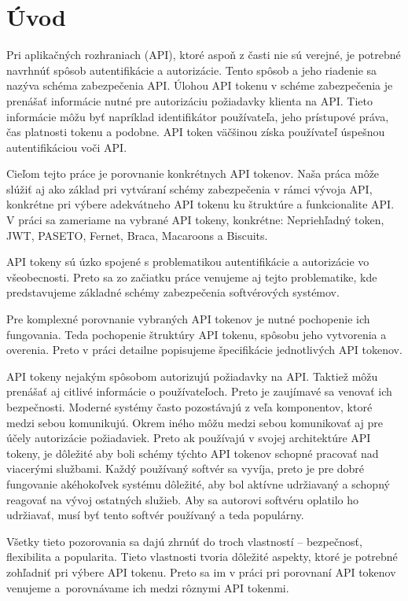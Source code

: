 \chapter*{Úvod} %

Pri aplikačných rozhraniach (API), ktoré aspoň z časti nie sú verejné, je potrebné navrhnúť spôsob autentifikácie a autorizácie. Tento spôsob a jeho riadenie sa nazýva schéma zabezpečenia API. Úlohou API tokenu v schéme zabezpečenia je prenášať informácie nutné pre autorizáciu požiadavky klienta na API. Tieto informácie môžu byť napríklad identifikátor používateľa, jeho prístupové práva, čas platnosti tokenu a podobne. API token väčšinou získa používateľ úspešnou autentifikáciou voči API.

Cieľom tejto práce je porovnanie konkrétnych API tokenov. Naša práca môže slúžiť aj ako základ pri vytváraní schémy zabezpečenia v rámci vývoja API, konkrétne pri výbere adekvátneho API tokenu ku štruktúre a funkcionalite API. V práci sa zameriame na vybrané API tokeny, konkrétne: Nepriehľadný token, JWT, PASETO, Fernet, Braca, Macaroons a Biscuits.

API tokeny sú úzko spojené s problematikou autentifikácie a autorizácie vo všeobecnosti. Preto sa zo začiatku práce venujeme aj tejto problematike, kde predstavujeme základné schémy zabezpečenia softvérových systémov.

Pre komplexné porovnanie vybraných API tokenov je nutné pochopenie ich fungovania. Teda pochopenie štruktúry API tokenu, spôsobu jeho vytvorenia a overenia. Preto v práci detailne popisujeme špecifikácie jednotlivých API tokenov.

API tokeny nejakým spôsobom autorizujú požiadavky na API. Taktiež môžu prenášať aj citlivé informácie o používateľoch. Preto je zaujímavé sa venovať ich bezpečnosti. Moderné systémy často pozostávajú z veľa komponentov, ktoré medzi sebou komunikujú. Okrem iného môžu medzi sebou komunikovať aj pre účely autorizácie požiadaviek. Preto ak používajú v svojej architektúre API tokeny, je dôležité aby boli schémy týchto API tokenov schopné pracovať nad viacerými službami. Každý používaný softvér sa vyvíja, preto je pre dobré fungovanie akéhokoľvek systému dôležité, aby bol aktívne udržiavaný a schopný reagovať na vývoj ostatných služieb. Aby sa autorovi softvéru oplatilo ho udržiavať, musí byť tento softvér používaný a teda populárny.

Všetky tieto pozorovania sa dajú zhrnúť do troch vlastností -- bezpečnosť, flexibilita a popularita. Tieto vlastnosti tvoria dôležité aspekty, ktoré je potrebné zohľadniť pri výbere API tokenu. Preto sa im v práci pri porovnaní API tokenov venujeme a~porovnávame ich medzi rôznymi API tokenmi.

